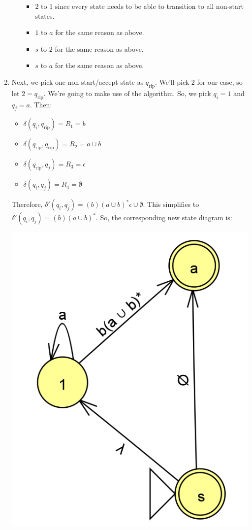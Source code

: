 \documentclass[letterpaper]{article}
\begin{document}
\begin{enumerate}
\begin{itemize}
        \begin{itemize}
            \item $2$ to $1$ since every state needs to be able to transition to all non-start states. 
            \item $1$ to $a$ for the same reason as above. 
            \item $s$ to $2$ for the same reason as above. 
            \item $s$ to $a$ for the same reason as above. 
        \end{itemize}
    \end{itemize}

    \item Next, we pick one non-start/accept state as $q_{\text{rip}}$. We'll pick $2$ for our case, so let $2 = q_{\text{rip}}$. We're going to make use of the  algorithm. So, we pick $q_i = 1$ and $q_j = a$. Then: 
    \begin{itemize}
        \item $\delta(q_i, q_{\text{rip}}) = R_1 = b$
        \item $\delta(q_{\text{rip}}, q_{\text{rip}}) = R_2 = a \cup b$
        \item $\delta(q_{\text{rip}}, q_j) = R_3 = \epsilon$
        \item $\delta(q_i, q_j) = R_4 = \emptyset$
    \end{itemize}
    Therefore, $\delta'(q_i, q_j) = (b)(a \cup b)^* \epsilon \cup \emptyset$. This simplifies to $\delta'(q_i, q_j) = (b)(a \cup b)^*$. So, the corresponding new state diagram is: 
    \begin{center}
        \includegraphics[scale=0.4]{../assets/dfa_regex_3.png}
    \end{center}


\end{enumerate}
\end{document}
